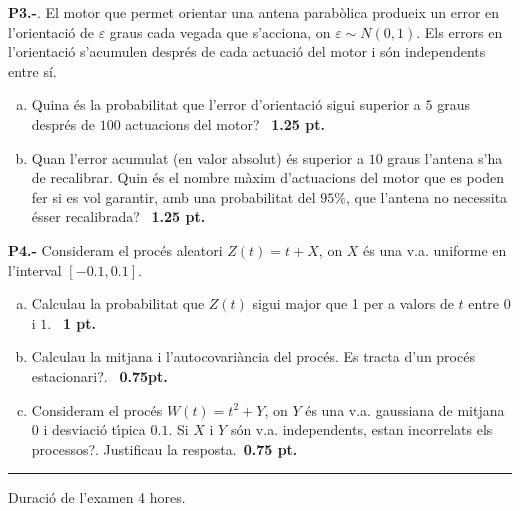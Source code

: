 \documentclass[11pt]{report}
\begin{document}
\noindent\textbf{P3.-}.
El motor que permet orientar una antena parab\`olica produeix un error en l'orientaci\'o de
$\varepsilon$ graus cada vegada que s'acciona, on $\varepsilon \sim N(0, 1)$. Els errors en
l'orientaci\'o s'acumulen despr\'es de cada actuaci\'o del motor i s\'on independents entre s\'i.
\begin{enumerate}[a)]
\item Quina \'es la probabilitat que l'error d'orientaci\'o sigui superior a $5$ graus despr\'es de
$100$ actuacions del motor?\ \hfill{\textbf{ 1.25 pt.}}
\item Quan l'error acumulat (en valor absolut) \'es superior a $10$ graus l'antena s'ha de recalibrar.
Quin \'es el nombre m\`axim d'actuacions del motor que es poden fer si es vol garantir, amb una
probabilitat del $95\%$, que l'antena no necessita \'esser recalibrada?\ \hfill{\textbf{ 1.25 pt.}}
\end{enumerate}



\vspace{0.75 cm}

\noindent\textbf{P4.-} Consideram el proc\'es aleatori $Z(t)=t + X$, on 
$X$ \'es una v.a. uniforme en l'interval $[-0.1, 0.1]$.
\begin{enumerate}[a)]
\item Calculau la probabilitat que $Z(t)$ sigui major que 1 per a valors de $t$ entre $0$ i $1$. 
\ \hfill{\textbf{1 pt.}}
\item Calculau la mitjana i l'autocovari\`ancia del proc\'es. Es tracta d'un proc\'es 
estacionari?. \ \hfill{\textbf{0.75pt.}}
\item Consideram el proc\'es $W(t)=t^2 + Y$, on $Y$ \'es una v.a. gaussiana
de mitjana $0$ i desviaci\'o t\'\i pica $0.1$. Si $X$ i $Y$ s\'on v.a. independents,
estan incorrelats els processos?. Justificau la resposta.\ \hfill{\textbf{0.75 pt.}}
\end{enumerate}




\vspace{0.75 cm}

\hrule

\vspace{0.5 cm}

\noindent Duraci\'o de l'examen 4 hores.\newline
\end{document}
